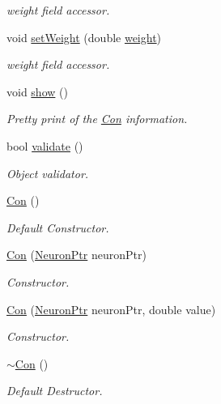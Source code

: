 \begin{DoxyCompactItemize}
\begin{DoxyCompactList}\small\item\em weight field accessor. \end{DoxyCompactList}\item 
void \hyperlink{class_con_acf3b130556e25414cd525d469b275239}{setWeight} (double \hyperlink{class_con_a7f46485ba5b41971ea38641f9e7d1be0}{weight})
\begin{DoxyCompactList}\small\item\em weight field accessor. \end{DoxyCompactList}\item 
void \hyperlink{class_con_ab85838575b5e01f3b8073136f2102922}{show} ()
\begin{DoxyCompactList}\small\item\em Pretty print of the \hyperlink{class_con}{Con} information. \end{DoxyCompactList}\item 
bool \hyperlink{class_con_af5f836a7b0988b3d9113589b2959d5e6}{validate} ()
\begin{DoxyCompactList}\small\item\em Object validator. \end{DoxyCompactList}\item 
\hyperlink{class_con_a61621054cc1ee979385c81207ee0bceb}{Con} ()
\begin{DoxyCompactList}\small\item\em Default Constructor. \end{DoxyCompactList}\item 
\hyperlink{class_con_a9cebcd0e50b00f70e962997a8343cbb5}{Con} (\hyperlink{_a_m_o_r_e_8h_ac1ea936c2c7728eb382278131652fef4}{NeuronPtr} neuronPtr)
\begin{DoxyCompactList}\small\item\em Constructor. \end{DoxyCompactList}\item 
\hyperlink{class_con_a24c0cd2e7eea23c3a0c9435c6a238a14}{Con} (\hyperlink{_a_m_o_r_e_8h_ac1ea936c2c7728eb382278131652fef4}{NeuronPtr} neuronPtr, double value)
\begin{DoxyCompactList}\small\item\em Constructor. \end{DoxyCompactList}\item 
\hyperlink{class_con_a703b044611253c7a0a9e057ed62a3d22}{$\sim$Con} ()
\begin{DoxyCompactList}\small\item\em Default Destructor. \end{DoxyCompactList}\item 

\end{DoxyCompactItemize}
